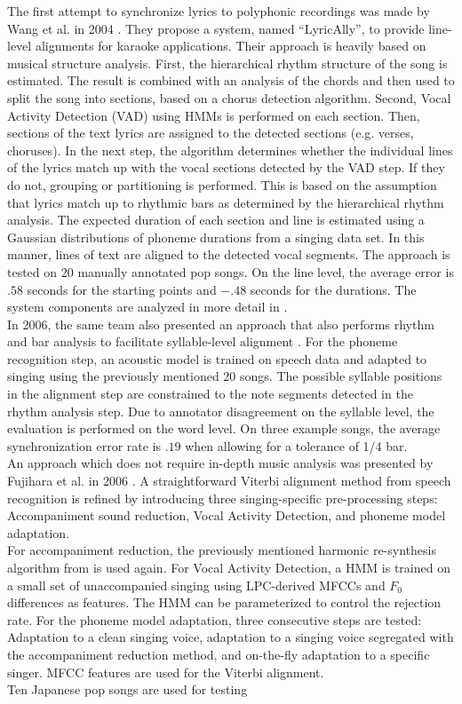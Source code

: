 The first attempt to synchronize lyrics to polyphonic recordings was made by Wang et al. in 2004 \cite{Wang2004}. They propose a system, named ``LyricAlly'', to provide line-level alignments for karaoke applications. Their approach is heavily based on musical structure analysis. First, the hierarchical rhythm structure of the song is estimated. The result is combined with an analysis of the chords and then used to split the song into sections, based on a chorus detection algorithm. Second, Vocal Activity Detection (VAD) using HMMs is performed on each section. Then, sections of the text lyrics are assigned to the detected sections (e.g. verses, choruses). In the next step, the algorithm determines whether the individual lines of the lyrics match up with the vocal sections detected by the VAD step. If they do not, grouping or partitioning is performed. This is based on the assumption that lyrics match up to rhythmic bars as determined by the hierarchical rhythm analysis. The expected duration of each section and line is estimated using a Gaussian distributions of phoneme durations from a singing data set. In this manner, lines of text are aligned to the detected vocal segments. The approach is tested on 20 manually annotated pop songs. On the line level, the average error is $.58$ seconds for the starting points and $-.48$ seconds for the durations. The system components are analyzed in more detail in \cite{lyrically}.\\
In 2006, the same team also presented an approach that also performs rhythm and bar analysis to facilitate syllable-level alignment \cite{Iskandar:2006}. For the phoneme recognition step, an acoustic model is trained on speech data and adapted to singing using the previously mentioned 20 songs. The possible syllable positions in the alignment step are constrained to the note segments detected in the rhythm analysis step. Due to annotator disagreement on the syllable level, the evaluation is performed on the word level. On three example songs, the average synchronization error rate is $.19$ when allowing for a tolerance of 1/4 bar.\\  
\medskip
An approach which does not require in-depth music analysis was presented by Fujihara et al. in 2006 \cite{fujihara_alignment}. A straightforward Viterbi alignment method from speech recognition is refined by introducing three singing-specific pre-processing steps: Accompaniment sound reduction, Vocal Activity Detection, and phoneme model adaptation.\\
For accompaniment reduction, the previously mentioned harmonic re-synthesis algorithm from \cite{fujihara_identification} is used again. For Vocal Activity Detection, a HMM is trained on a small set of unaccompanied singing using LPC-derived MFCCs and $F_0$ differences as features. The HMM can be parameterized to control the rejection rate. For the phoneme model adaptation, three consecutive steps are tested: Adaptation to a clean singing voice, adaptation to a singing voice segregated with the accompaniment reduction method, and on-the-fly adaptation to a specific singer. MFCC features are used for the Viterbi alignment.\\
Ten Japanese pop songs are used for testing

